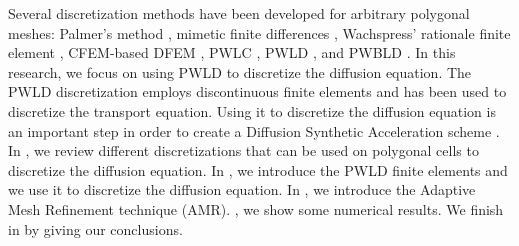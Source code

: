 Several discretization methods have been developed for arbitrary polygonal
meshes: Palmer's method \cite{Palmer2001}, mimetic finite differences
\cite{Lipnikov2004,Hyman2002,Kuznetsov2004,Brezzi2005},
Wachspress' rationale finite element \cite{Wachspress1975},
CFEM-based DFEM \cite{Warsa2008}, PWLC \cite{Bailey2008a}, PWLD 
\cite{Stone2003,Bailey2008,Bailey2008a}, and PWBLD \cite{Bailey2011}. In this
research, we focus on using PWLD to discretize the diffusion equation. The
PWLD discretization employs discontinuous finite elements and has been used to
discretize the transport equation. Using it to discretize the diffusion
equation is an important step in order to create a Diffusion Synthetic
Acceleration scheme \cite{Adams2002,Wang2010}.
In , we review different discretizations that can be used on
polygonal cells to discretize the diffusion equation. In , we
introduce the PWLD finite elements and we use it to discretize the diffusion
equation. In , we introduce the Adaptive Mesh Refinement
technique (AMR). , we show some numerical results. We finish
in  by giving our conclusions.
